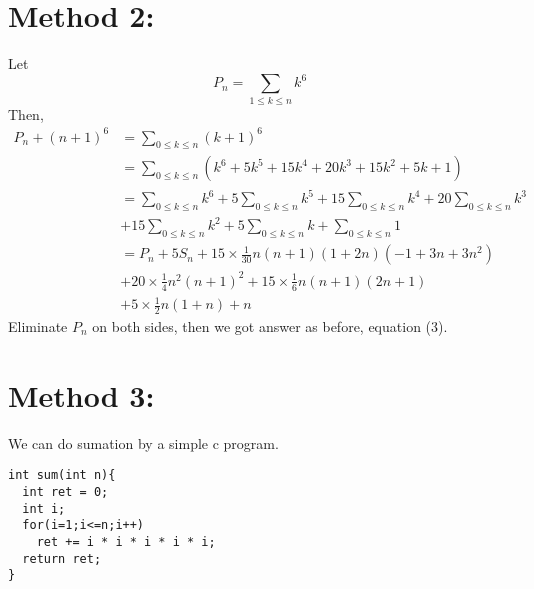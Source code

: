 \documentclass{article}
\begin{document}
\section{Method 2:}
Let $$P_n=\sum_{1 \leq k \leq n} k^6 $$
Then,
\begin{equation}
\begin{aligned}
P_n + (n+1)^6 &= \sum_{0 \leq k \leq n} (k+1)^6\\
&= \sum_{0 \leq k \leq n} (k^6 + 5k^5 + 15k^4 + 20k^3 + 15k^2 + 5k + 1)\\
&= \sum_{0 \leq k \leq n} k^6 + 5\sum_{0 \leq k \leq n} k^5 +
   15\sum_{0 \leq k \leq n} k^4 +20\sum_{0 \leq k \leq n} k^3 \\
& +15\sum_{0 \leq k \leq n} k^2 + 5\sum_{0 \leq k \leq n} k   +
   \sum_{0 \leq k \leq n} 1\\
&= P_n + 5S_n + 15 \times \frac{1}{30}n(n+1)(1+2n)(-1+3n+3n^2) \\
& +20 \times \frac{1}{4}n^2(n+1)^2 +15 \times \frac{1}{6}n(n+1)(2n+1) \\
& +5 \times \frac{1}{2}n(1+n) + n
\end{aligned}
\end{equation}
Eliminate $P_n$ on both sides, then we got answer as before, equation (3).
\section{Method 3:}
We can do sumation by a simple c program.
\begin{verbatim}
int sum(int n){
  int ret = 0;
  int i;
  for(i=1;i<=n;i++)
    ret += i * i * i * i * i;
  return ret;
}
\end{verbatim}
\end{document}
